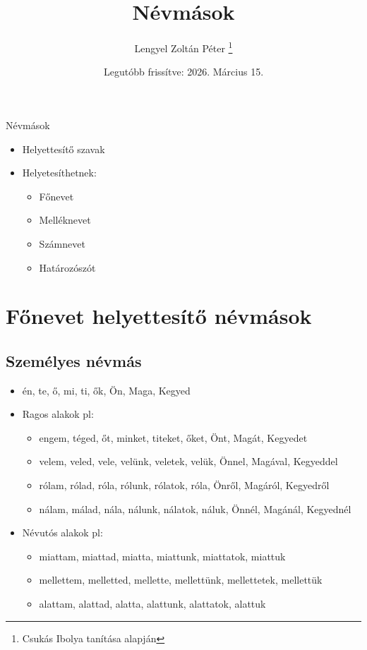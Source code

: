\documentclass{article}
\title{Névmások}
\author{Lengyel Zoltán Péter \thanks{Csukás Ibolya tanítása alapján}}
\date{Legutóbb frissítve: 2026. Március 15.}
\begin{document}
\maketitle
\tableofcontents
\newpage

\begin{center}
    {\Huge Névmások}
\end{center}

\begin{itemize}
    \item Helyettesítő szavak
    \item Helyetesíthetnek: \begin{itemize}
        \item Főnevet
        \item Melléknevet
        \item Számnevet
        \item Határozószót
    \end{itemize}
\end{itemize}

\section{Főnevet helyettesítő névmások}
\subsection{Személyes névmás}
\begin{itemize}
    \item én, te, ő, mi, ti, ők, Ön, Maga, Kegyed
    \item Ragos alakok pl: \begin{itemize}
        \item engem, téged, őt, minket, titeket, őket, Önt, Magát, Kegyedet
        \item velem, veled, vele, velünk, veletek, velük, Önnel, Magával, Kegyeddel
        \item rólam, rólad, róla, rólunk, rólatok, róla, Önről, Magáról, Kegyedről
        \item nálam, málad, nála, nálunk, nálatok, náluk, Önnél, Magánál, Kegyednél
    \end{itemize}
    \item Névutós alakok pl: \begin{itemize}
        \item miattam, miattad, miatta, miattunk, miattatok, miattuk
        \item mellettem, melletted, mellette, mellettünk, mellettetek, mellettük
        \item alattam, alattad, alatta, alattunk, alattatok, alattuk
    \end{itemize}
\end{itemize}
\end{document}

